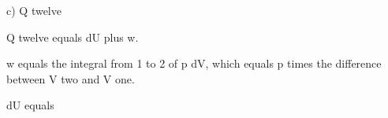 c) Q twelve

Q twelve equals dU plus w.

w equals the integral from 1 to 2 of p dV, which equals p times the difference between V two and V one.

dU equals